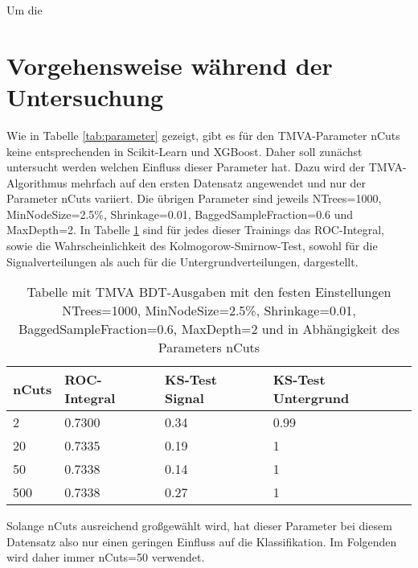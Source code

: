 Um die 

\section{Vorgehensweise w\"ahrend der Untersuchung}
\label{ch:Vergleich:sec:ttH}

Wie in Tabelle \ref{tab:parameter} gezeigt, gibt es f\"ur den TMVA-Parameter nCuts keine entsprechenden in Scikit-Learn und XGBoost. Daher soll zun\"achst untersucht werden welchen Einfluss dieser Parameter hat. Dazu wird der TMVA-Algorithmus mehrfach auf den ersten Datensatz angewendet und nur der Parameter nCuts variiert. Die \"ubrigen Parameter sind jeweils NTrees=1000, MinNodeSize=2.5\%, Shrinkage=0.01, BaggedSampleFraction=0.6 und MaxDepth=2.
In Tabelle \ref{tab:nCuts} sind f\"ur jedes dieser Trainings das ROC-Integral, sowie die Wahrscheinlichkeit des Kolmogorow-Smirnow-Test, sowohl f\"ur die Signalverteilungen als auch f\"ur die Untergrundverteilungen, dargestellt.

\begin{table}[tbp]\parbox{12cm}{
  \caption[Variation des TMVA-nCuts-Parameters]{Tabelle mit TMVA BDT-Ausgaben mit den festen Einstellungen NTrees=1000, MinNodeSize=2.5\%, Shrinkage=0.01, BaggedSampleFraction=0.6, MaxDepth=2 und in Abh\"angigkeit des Parameters nCuts}%
  }\label{tab:nCuts}
  \begin{center}
  \begin{tabular}{llll}
  \hline
  nCuts & ROC-Integral & KS-Test Signal & KS-Test Untergrund\\
  \hline
  \num{2} & \num{0,7300} & \num{0,34} & \num{0,99}\\
 \num{20} & \num{0,7335} & \num{0,19} & \num{1}\\
 \num{50} & \num{0,7338} & \num{0,14} & \num{1}\\
\num{500} & \num{0,7338} & \num{0,27} & \num{1}\\
  \hline
  \end{tabular}
  \end{center}
\end{table}

Solange nCuts ausreichend gro\ss  gew\"ahlt wird, hat dieser Parameter bei diesem Datensatz also nur einen geringen Einfluss auf die Klassifikation. Im Folgenden wird daher immer nCuts=\num{50} verwendet.

